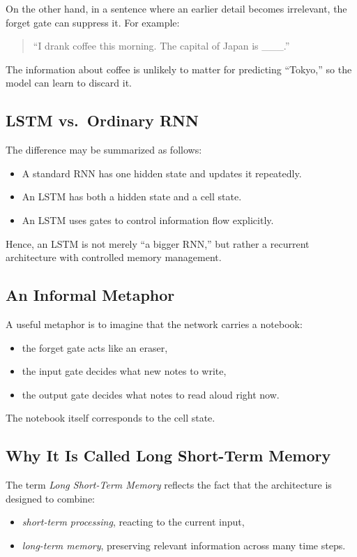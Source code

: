 On the other hand, in a sentence where an earlier detail becomes irrelevant, the forget gate can suppress it. For example:
\begin{quote}
``I drank coffee this morning. The capital of Japan is \_\_\_.''
\end{quote}
The information about coffee is unlikely to matter for predicting ``Tokyo,'' so the model can learn to discard it.

\subsection{LSTM vs.\ Ordinary RNN}

The difference may be summarized as follows:

\begin{itemize}
    \item A standard RNN has one hidden state and updates it repeatedly.
    \item An LSTM has both a hidden state and a cell state.
    \item An LSTM uses gates to control information flow explicitly.
\end{itemize}

Hence, an LSTM is not merely ``a bigger RNN,'' but rather a recurrent architecture with controlled memory management.

\subsection{An Informal Metaphor}

A useful metaphor is to imagine that the network carries a notebook:
\begin{itemize}
    \item the forget gate acts like an eraser,
    \item the input gate decides what new notes to write,
    \item the output gate decides what notes to read aloud right now.
\end{itemize}

The notebook itself corresponds to the cell state.

\subsection{Why It Is Called Long Short-Term Memory}

The term \emph{Long Short-Term Memory} reflects the fact that the architecture is designed to combine:
\begin{itemize}
    \item \emph{short-term processing}, reacting to the current input,
    \item \emph{long-term memory}, preserving relevant information across many time steps.
\end{itemize}

